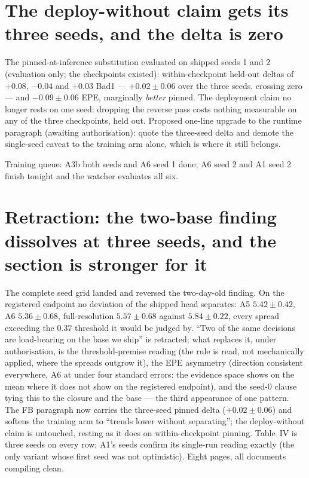 \documentclass[11pt,a4paper]{article}
\begin{document}
\section*{The deploy-without claim gets its three seeds, and the delta is zero}

The pinned-at-inference substitution evaluated on shipped seeds 1 and 2
(evaluation only; the checkpoints existed): within-checkpoint held-out
deltas of $+0.08$, $-0.04$ and $+0.03$ Bad1 --- $+0.02\pm0.06$ over the
three seeds, crossing zero --- and $-0.09\pm0.06$ EPE, marginally
\emph{better} pinned. The deployment claim no longer rests on one seed:
dropping the reverse pass costs nothing measurable on any of the three
checkpoints, held out. Proposed one-line upgrade to the runtime paragraph
(awaiting authorisation): quote the three-seed delta and demote the
single-seed caveat to the training arm alone, which is where it still
belongs.

Training queue: A3b both seeds and A6 seed 1 done; A6 seed 2 and A1 seed 2
finish tonight and the watcher evaluates all six.



\section*{Retraction: the two-base finding dissolves at three seeds, and the section is stronger for it}

The complete seed grid landed and reversed the two-day-old finding. On the
registered endpoint no deviation of the shipped head separates: A5
$5.42\pm0.42$, A6 $5.36\pm0.68$, full-resolution $5.57\pm0.68$ against
$5.84\pm0.22$, every spread exceeding the $0.37$ threshold it would be
judged by. ``Two of the same decisions are load-bearing on the base we
ship'' is retracted; what replaces it, under authorisation, is the
threshold-premise reading (the rule is read, not mechanically applied, where
the spreads outgrow it), the EPE asymmetry (direction consistent everywhere,
A6 at under four standard errors: the evidence space shows on the mean where
it does not show on the registered endpoint), and the seed-$0$ clause tying
this to the closure and the base --- the third appearance of one pattern.
The FB paragraph now carries the three-seed pinned delta ($+0.02\pm0.06$)
and softens the training arm to ``trends lower without separating''; the
deploy-without claim is untouched, resting as it does on within-checkpoint
pinning. Table~IV is three seeds on every row; A1's seeds confirm its
single-run reading exactly (the only variant whose first seed was not
optimistic). Eight pages, all documents compiling clean.
\end{document}
